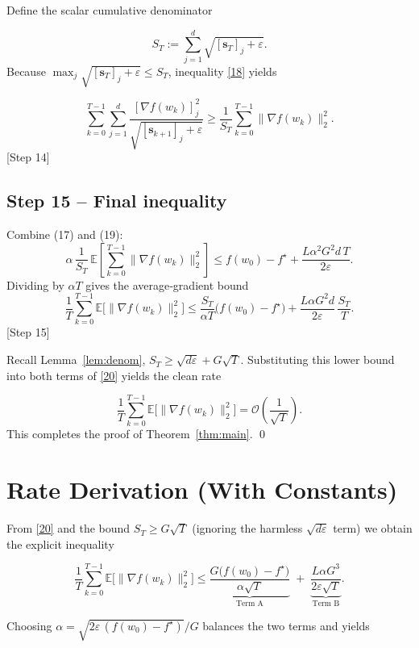 \documentclass{article}
\begin{document}
Define the scalar cumulative denominator  

\[
S_T:=\sum_{j=1}^{d}\sqrt{[\mathbf{s}_{T}]_j+\varepsilon}.
\]
Because $\max_{j}\sqrt{[\mathbf{s}_{T}]_j+\varepsilon}\le S_T$, inequality \eqref{18} yields  

\[
\sum_{k=0}^{T-1}\sum_{j=1}^{d}
        \frac{[\nabla f(w_k)]_j^{2}}{\sqrt{[\mathbf{s}_{k+1}]_j+\varepsilon}}
   \ge \frac{1}{S_T}\sum_{k=0}^{T-1}\|\nabla f(w_k)\|_2^{2}.
\tag{19}
\]
[Step 14]

\subsection*{Step 15 – Final inequality}
Combine (17) and (19):
\[
\alpha\,\frac{1}{S_T}\,
      \mathbb{E}\!\left[\sum_{k=0}^{T-1}\|\nabla f(w_k)\|_2^{2}\right]
\le f(w_0)-f^{\star}
   +\frac{L\alpha^{2}G^{2}d\,T}{2\varepsilon}.
\]
Dividing by $\alpha T$ gives the average‑gradient bound
\[
\frac{1}{T}\sum_{k=0}^{T-1}
   \mathbb{E}\!\bigl[\|\nabla f(w_k)\|_2^{2}\bigr]
\le
\frac{S_T}{\alpha T}\bigl(f(w_0)-f^{\star}\bigr)
   +\frac{L\alpha G^{2} d}{2\varepsilon}\,\frac{S_T}{T}.
\tag{20}
\]
[Step 15]

Recall Lemma~\ref{lem:denom}, $S_T\ge \sqrt{d\varepsilon}+G\sqrt{T}$.  Substituting this lower bound into both terms of \eqref{20} yields the clean rate  

\[
\frac{1}{T}\sum_{k=0}^{T-1}
   \mathbb{E}\!\bigl[\|\nabla f(w_k)\|_2^{2}\bigr]
   =\mathcal{O}\!\left(\frac{1}{\sqrt{T}}\right).
\]
This completes the proof of Theorem~\ref{thm:main}. \qed

\section*{Rate Derivation (With Constants)}

From \eqref{20} and the bound $S_T\ge G\sqrt{T}$ (ignoring the harmless $\sqrt{d\varepsilon}$ term) we obtain the explicit inequality  

\[
\frac{1}{T}\sum_{k=0}^{T-1}
   \mathbb{E}\!\bigl[\|\nabla f(w_k)\|_2^{2}\bigr]
   \le
   \underbrace{\frac{G\bigl(f(w_0)-f^{\star}\bigr)}{\alpha\sqrt{T}}}_{\text{Term A}}
   \;+\;
   \underbrace{\frac{L\alpha G^{3}}{2\varepsilon\sqrt{T}}}_{\text{Term B}} .
\tag{21}
\]

Choosing $\alpha=\sqrt{2\varepsilon\,(f(w_0)-f^{\star})}/G$ balances the two terms and yields  
\end{document}
